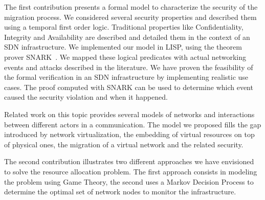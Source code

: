 The first contribution presents a formal model to characterize the security of the migration process. We considered several security properties and described them using a temporal first order logic. Traditional properties like Confidentiality, Integrity and Availability are described and detailed them in the context of an SDN infrastructure.
We implemented our model in LISP, using the theorem prover SNARK~\cite{snark-Stickel2000}.
We mapped these logical predicates with actual networking events and attacks described in the literature.
We have proven the feasibility of the formal verification in an SDN infrastructure by implementing realistic use cases.
The proof computed with SNARK can be used to determine which event caused the security violation and when it happened.

Related work on this topic provides several models of networks and interactions between different actors in a communication. The model we proposed fills the gap introduced by network virtualization, the embedding of virtual resources on top of physical ones, the migration of a virtual network and the related security. 

The second contribution illustrates two different approaches we have envisioned to solve the resource allocation problem. The first approach consists in modeling the problem using Game Theory, the second uses a Markov Decision Process to determine the optimal set of network nodes to monitor the infrastructure.


